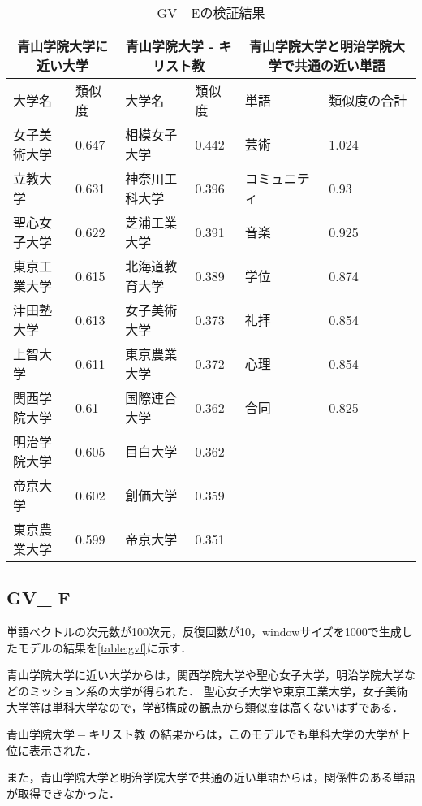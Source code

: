 \begin{table}[H]
\caption{GV\_ Eの検証結果}
\centering
\footnotesize
\begin{tabular}{ll|ll|ll}
\hline
\multicolumn{2}{c}{青山学院大学に近い大学} & \multicolumn{2}{c}{青山学院大学 - キリスト教} & \multicolumn{2}{c}{青山学院大学と明治学院大学で共通の近い単語}
\\ \hline
大学名 & 類似度 & 大学名 & 類似度 & 単語 & 類似度の合計
\\ \hline \hline
女子美術大学 & 0.647 & 相模女子大学 & 0.442 & 芸術 & 1.024\\
立教大学 & 0.631 & 神奈川工科大学 & 0.396 & コミュニティ & 0.93\\
聖心女子大学 & 0.622 & 芝浦工業大学 & 0.391 & 音楽 & 0.925\\
東京工業大学 & 0.615 & 北海道教育大学 & 0.389 & 学位 & 0.874\\
津田塾大学 & 0.613 & 女子美術大学 & 0.373 & 礼拝 & 0.854\\
上智大学 & 0.611 & 東京農業大学 & 0.372 & 心理 & 0.854\\
関西学院大学 & 0.61 & 国際連合大学 & 0.362 & 合同 & 0.825\\
明治学院大学 & 0.605 & 目白大学 & 0.362 & & \\
帝京大学 & 0.602 & 創価大学 & 0.359 & & \\
東京農業大学 & 0.599 & 帝京大学 & 0.351 & & \\ \hline
\end{tabular}
\label{table:gve}
\end{table}

\subsection{GV\_ F}
単語ベクトルの次元数が100次元，反復回数が10，windowサイズを1000で生成したモデルの結果を\ref{table:gvf}に示す．

青山学院大学に近い大学からは，関西学院大学や聖心女子大学，明治学院大学などのミッション系の大学が得られた．
聖心女子大学や東京工業大学，女子美術大学等は単科大学なので，学部構成の観点から類似度は高くないはずである．

$ 青山学院大学 - キリスト教 $ の結果からは，このモデルでも単科大学の大学が上位に表示された．

また，青山学院大学と明治学院大学で共通の近い単語からは，関係性のある単語が取得できなかった．

